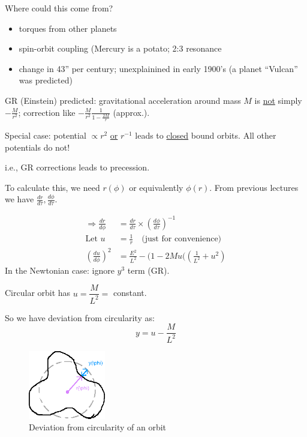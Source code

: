 \documentclass[a4paper]{article} %
\begin{document}
Where could this come from? 
\begin{itemize}
\item torques from other planets
\item spin-orbit coupling (Mercury is a potato; 2:3 resonance
\item change in 43'' per century; unexplainined in early 1900's (a planet ``Vulcan'' was predicted)
\end{itemize}

GR (Einstein) predicted: gravitational acceleration around mass $M$ is \underline{not} simply $-\frac{M}{r^2}$; correction like $-\frac{M}{r^2}\frac{1}{1-\frac{2M}{r}}$ (approx.).

Special case: potential $\propto r^2$ \underline{or} $r^{-1}$ leads to \underline{closed} bound orbits. All other potentials do not!

i.e., GR corrections leads to precession.

To calculate this, we need $r(\phi)$ or equivalently $\phi(r)$. From previous lectures we have $\frac{dr}{d\tau},\frac{d\phi}{d\tau}$.

\begin{align}
\Rightarrow \frac{dr}{d\phi}&=\frac{dr}{d\tau}\times\left(\frac{d\phi}{d\tau}\right)^{-1}\\
\text{Let } u&=\frac{1}{r}\quad\text{(just for convenience)}\\
\left(\frac{du}{d\phi}\right)^2&=\frac{E^2}{L^2}-(1-2Mu(\left(\frac{1}{L^2}+u^2\right)\label{du dphi}
\end{align}
In the Newtonian case: ignore $y^3$ term (GR).

Circular orbit has $u=\dfrac{M}{L^2}=$ constant.

So we have deviation from circularity as:
\begin{equation}
y=u-\frac{M}{L^2}
\end{equation}

\begin{figure}[h]
\centering
\includegraphics[width=0.3\textwidth]{images/dev-from-circularity.png}
\caption{Deviation from circularity of an orbit}
\end{figure}
\end{document}
